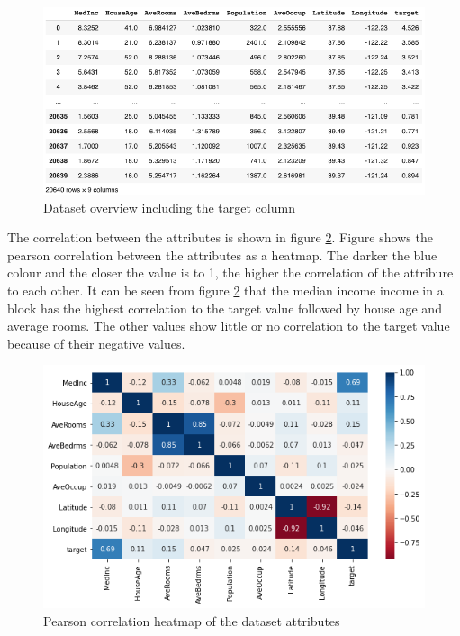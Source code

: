 \documentclass[conference]{IEEEtran}
\begin{document}
\begin{figure}[htbp]
	\centerline{\includegraphics [scale=0.32]{figures/overview_dataset_with_target.png}}
	\caption{Dataset overview including the target column}
	\label{fig:overview_dataset_with_target}
\end{figure}

The correlation between the attributes is shown in figure \ref{fig:correlation_heatmap}. Figure shows the pearson correlation between the attributes as a heatmap. The darker the blue colour and the closer the value is to 1, the higher the correlation of the attribure to each other. It can be seen from figure \ref{fig:correlation_heatmap} that the median income income in a block has the highest correlation to the target value followed by house age and average rooms. The other values show little or no correlation to the target value because of their negative values.

\begin{figure}[htbp]
	\centerline{\includegraphics [scale=0.5]{figures/heatmap_correlation.png}}
	\caption{Pearson correlation heatmap of the dataset attributes}
	\label{fig:correlation_heatmap}
\end{figure}
\end{document}
